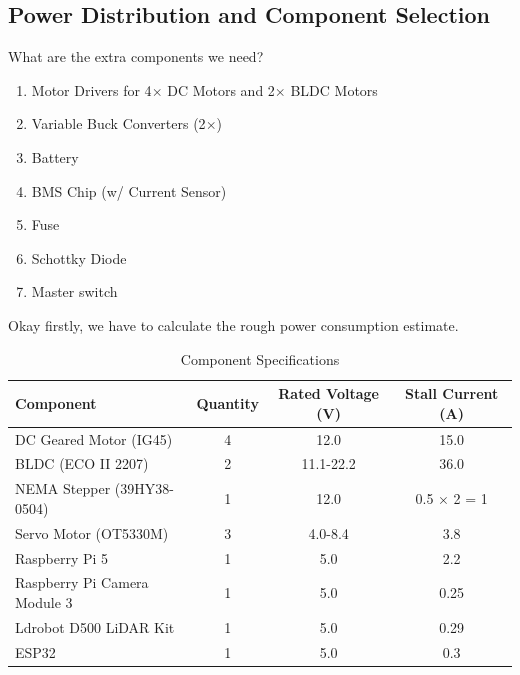 \documentclass[12pt]{article}
\begin{document}
\subsection*{Power Distribution and Component Selection}
What are the extra components we need?
\begin{enumerate}
    \item Motor Drivers for 4$\times$ DC Motors and 2$\times$ BLDC Motors
    \item Variable Buck Converters (2$\times$)
    \item Battery
    \item BMS Chip (w/ Current Sensor)
    \item Fuse
    \item Schottky Diode
    \item Master switch
\end{enumerate}

Okay firstly, we have to calculate the rough power consumption estimate.

\begin{table}[h]
\centering
\begin{tabular}{|l|c|c|c|}
\hline
\textbf{Component} & \textbf{Quantity} & \textbf{Rated Voltage (V)} & \textbf{Stall Current (A)} \\
\hline
DC Geared Motor (IG45) & 4 & 12.0 & 15.0 \\
\hline
BLDC (ECO II 2207) & 2 & 11.1-22.2 & 36.0 \\
\hline
NEMA Stepper (39HY38-0504) & 1 & 12.0 & 0.5 $\times$ 2 = 1 \\
\hline
Servo Motor (OT5330M) & 3 & 4.0-8.4 & 3.8 \\
\hline
Raspberry Pi 5 & 1 & 5.0 & 2.2 \\
\hline
Raspberry Pi Camera Module 3 & 1 & 5.0 & 0.25 \\
\hline
Ldrobot D500 LiDAR Kit & 1 & 5.0 & 0.29 \\
\hline
ESP32 & 1 & 5.0 & 0.3 \\
\hline
\end{tabular}
    \caption{Component Specifications}
\end{table}
\end{document}
